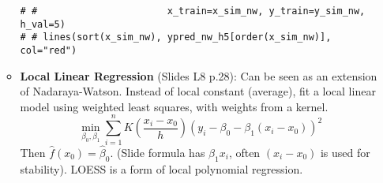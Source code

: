 \documentclass[12pt,a4paper]{article}
\begin{document}
\begin{itemize}
\begin{itemize}
\begin{lstlisting}[caption={Nadaraya-Watson with Gaussian Kernel (Slides L8 p.19)}]
# #                       x_train=x_sim_nw, y_train=y_sim_nw, h_val=5)
# # lines(sort(x_sim_nw), ypred_nw_h5[order(x_sim_nw)], col="red")
\end{lstlisting}
            \item \textbf{Local Linear Regression} (Slides L8 p.28): Can be seen as an extension of Nadaraya-Watson. Instead of local constant (average), fit a local linear model using weighted least squares, with weights from a kernel.
                $$ \min_{\beta_0, \beta_1} \sum_{i=1}^n K\left(\frac{x_i-x_0}{h}\right) (y_i - \beta_0 - \beta_1(x_i-x_0))^2 $$
                Then $\hat{f}(x_0) = \hat{\beta}_0$. (Slide formula has $\beta_1 x_i$, often $(x_i-x_0)$ is used for stability). LOESS is a form of local polynomial regression.
        \end{itemize}


\end{itemize}
\end{document}
